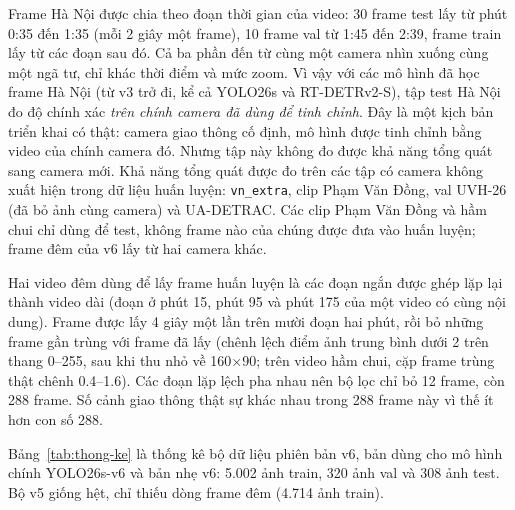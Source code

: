 Frame Hà Nội được chia theo đoạn thời gian của video: 30 frame test lấy từ phút 0:35 đến 1:35 (mỗi 2 giây một frame),
10 frame val từ 1:45 đến 2:39, frame train lấy từ các đoạn sau đó. Cả ba phần đến từ cùng một camera nhìn
xuống cùng một ngã tư, chỉ khác thời điểm và mức zoom. Vì vậy với các mô hình đã học frame Hà Nội (từ v3 trở đi, kể
cả YOLO26s và RT-DETRv2-S), tập test
Hà Nội đo độ chính xác \emph{trên chính camera đã dùng để tinh chỉnh}. Đây là một kịch bản triển khai có thật: camera
giao thông cố định, mô hình được tinh chỉnh bằng video của chính camera đó. Nhưng tập này không đo được khả năng tổng
quát sang camera mới. Khả năng tổng quát được đo trên các tập có camera không xuất hiện trong dữ liệu huấn luyện:
\texttt{vn\_extra}, clip Phạm Văn Đồng, val UVH-26 (đã bỏ ảnh cùng camera) và UA-DETRAC. Các clip Phạm Văn Đồng và hầm
chui chỉ dùng để test, không frame nào của chúng được đưa vào huấn luyện; frame đêm của v6 lấy từ hai camera khác.

Hai video đêm dùng để lấy frame huấn luyện là các đoạn ngắn được ghép lặp lại thành video dài (đoạn ở phút 15, phút 95
và phút 175 của một video có cùng nội dung). Frame được lấy 4 giây một lần trên mười đoạn hai phút, rồi bỏ những frame
gần trùng với frame đã lấy (chênh lệch điểm ảnh trung bình dưới 2 trên thang 0--255, sau khi thu nhỏ về 160×90; trên
video hầm chui, cặp frame trùng thật chênh 0.4--1.6). Các đoạn lặp lệch pha nhau nên bộ lọc chỉ bỏ 12 frame, còn 288
frame. Số cảnh giao thông thật sự khác nhau trong 288 frame này vì thế ít hơn con số 288.

Bảng~\ref{tab:thong-ke} là thống kê bộ dữ liệu phiên bản v6, bản dùng cho mô hình chính YOLO26s-v6 và bản nhẹ v6:
5.002 ảnh train, 320 ảnh val và 308 ảnh test. Bộ v5 giống hệt, chỉ thiếu dòng frame đêm (4.714 ảnh train).

